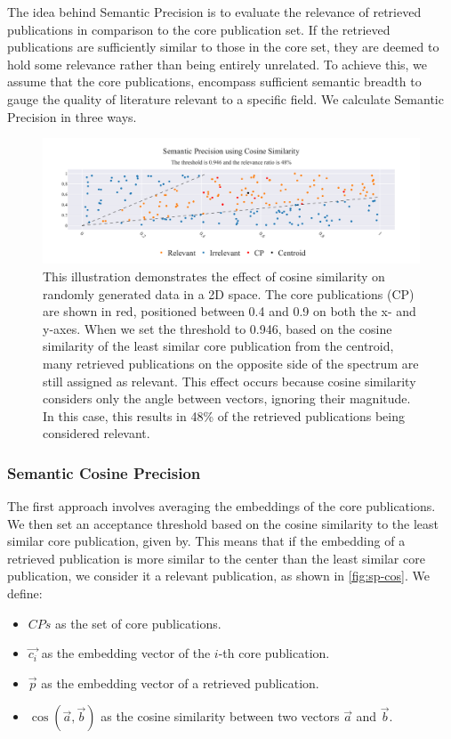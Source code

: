 The idea behind Semantic Precision is to evaluate the relevance of retrieved publications in comparison to the core publication set. If the retrieved publications are sufficiently similar to those in the core set, they are deemed to hold some relevance rather than being entirely unrelated. To achieve this, we assume that the core publications, encompass sufficient semantic breadth to gauge the quality of literature relevant to a specific field. We calculate Semantic Precision in three ways.

\begin{figure}[]
	\centering	
	\includegraphics[scale=0.4]{pics/sp_cos.pdf}
	\caption[Semantic Precision using Cosine Similarity]{This illustration demonstrates the effect of cosine similarity on randomly generated data in a 2D space. The core publications (CP) are shown in red, positioned between 0.4 and 0.9 on both the x- and y-axes. When we set the threshold to 0.946, based on the cosine similarity of the least similar core publication from the centroid, many retrieved publications on the opposite side of the spectrum are still assigned as relevant. This effect occurs because cosine similarity considers only the angle between vectors, ignoring their magnitude. In this case, this results in 48\% of the retrieved publications being considered relevant.}

	\label{fig:sp-cos}
\end{figure}

\subsubsection{Semantic Cosine Precision}

The first approach involves averaging the embeddings of the core publications. We then set an acceptance threshold based on the cosine similarity to the least similar core publication, given by. This means that if the embedding of a retrieved publication is more similar to the center than the least similar core publication, we consider it a relevant publication, as shown in \autoref{fig:sp-cos}. We define:
\begin{itemize}
	\item $CPs$ as the set of core publications.
	\item $\vec{c_i}$ as the embedding vector of the $i$-th core publication.
	\item $\vec{p}$ as the embedding vector of a retrieved publication.
	\item $\cos(\vec{a}, \vec{b})$ as the cosine similarity between two vectors $\vec{a}$ and $\vec{b}$.
\end{itemize}

